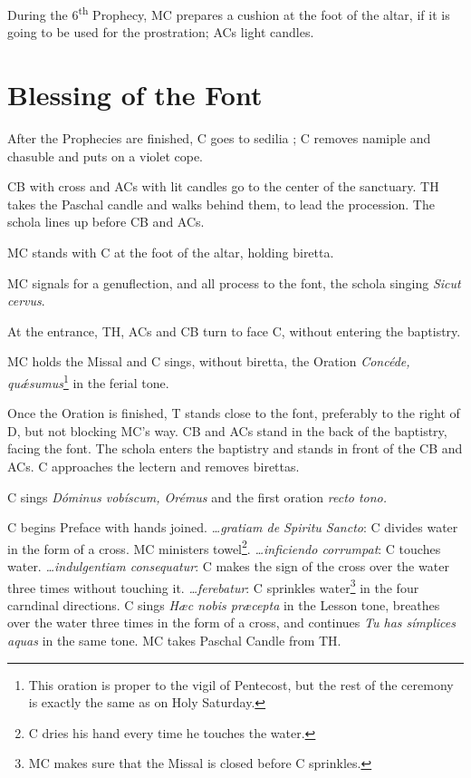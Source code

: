 {\rubric During the 6\textsuperscript{th} Prophecy, MC prepares a cushion at the
foot of the altar, if it is going to be used for the prostration; ACs light
candles.

\section{Blessing of the Font}

\rubric After the Prophecies are finished, C goes to sedilia \pbr; C removes
namiple and chasuble and puts on a violet cope.

\rubric CB with cross and ACs with lit candles go to the center of the
sanctuary. TH takes the Paschal candle and walks behind them, to lead the
procession. The schola lines up before CB and ACs.

\rubric MC stands with C at the foot of the altar, holding biretta.

\rubric MC signals for a genuflection, and all process to the font, the schola
singing \textit{Sicut cervus}.

\rubric At the entrance, TH, ACs and CB turn to face C, without entering the
baptistry.

\rubric MC holds the Missal and C sings, without biretta, the Oration
\textit{Concéde, qu\'æsumus}\footnote{This oration is proper to the vigil of
Pentecost, but the rest of the ceremony is exactly the same as on Holy
Saturday.} in the ferial tone.

\rubric Once the Oration is finished, T stands close to the font, preferably to
the right of D, but not blocking MC's way. CB and ACs stand in the back of the
baptistry, facing the font. The schola enters the baptistry and stands in front
of the CB and ACs. C approaches the lectern and removes birettas.

\rubric C sings \textit{Dóminus vobíscum, Orémus} and the first oration
\textit{recto tono.}

\rubric C begins Preface with hands joined. \textit{\dots gratiam de Spiritu
Sancto}: C divides water in the form of a cross. MC ministers towel\footnote{C
dries his hand every time he touches the water.}. \textit{\dots inficiendo
corrumpat}: C touches water. \textit{\dots indulgentiam consequatur}: C makes
the sign of the cross over the water three times without touching it.
\textit{\dots ferebatur}: C sprinkles water\footnote{MC makes sure that the
Missal is closed before C sprinkles.} in the four carndinal directions. C sings
\textit{Hæc nobis præcepta} in the Lesson tone, breathes over the water three
times in the form of a cross, and continues \textit{Tu has símplices aquas} in
the same tone. MC takes Paschal Candle from TH.

}
